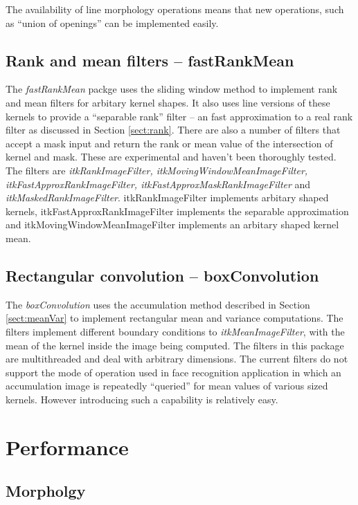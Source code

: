 \documentclass{InsightArticle}
\begin{document}
The availability of line morphology operations means that new
operations, such as ``union of openings'' can be implemented easily.

\subsection{Rank and mean filters -- fastRankMean}
The {\em fastRankMean} packge uses the sliding window method to
implement rank and mean filters for arbitary kernel shapes. It also
uses line versions of these kernels to provide a ``separable rank''
filter -- an fast approximation to a real rank filter as discussed in
Section \ref{sect:rank}. There are also a number of filters that
accept a mask input and return the rank or mean value of the
intersection of kernel and mask. These are experimental and haven't
been thoroughly tested. The filters are {\em itkRankImageFilter,
itkMovingWindowMeanImageFilter, itkFastApproxRankImageFilter,
itkFastApproxMaskRankImageFilter} and {\em
itkMaskedRankImageFilter}. itkRankImageFilter implements arbitary
shaped kernels, itkFastApproxRankImageFilter implements the separable
approximation and itkMovingWindowMeanImageFilter implements an
arbitary shaped kernel mean.

\subsection{Rectangular convolution -- boxConvolution}
The {\em boxConvolution} uses the accumulation method described in
Section \ref{sect:meanVar} to implement rectangular mean and variance
computations. The filters implement different boundary conditions to
{\em itkMeanImageFilter}, with the mean of the kernel inside the image
being computed. The filters in this package are multithreaded and deal
with arbitrary dimensions. The current filters do not support the mode
of operation used in face recognition application in which an
accumulation image is repeatedly ``queried'' for mean values of
various sized kernels. However introducing such a capability is
relatively easy.

\section{Performance}
\subsection{Morpholgy}
\end{document}
